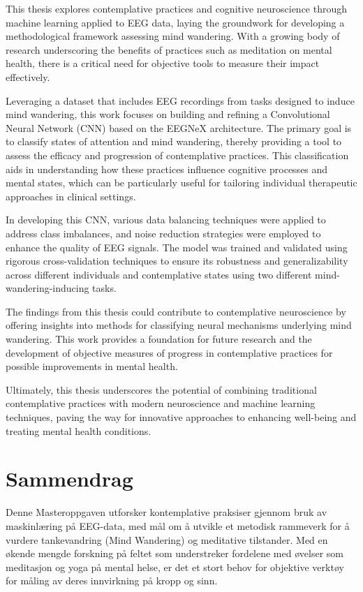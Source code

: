 
This thesis explores contemplative practices and cognitive neuroscience through machine learning applied to EEG data, laying the groundwork for developing a methodological framework assessing mind wandering. With a growing body of research underscoring the benefits of practices such as meditation on mental health, there is a critical need for objective tools to measure their impact effectively.

Leveraging a dataset that includes EEG recordings from tasks designed to induce mind wandering, this work focuses on building and refining a Convolutional Neural Network (CNN) based on the EEGNeX architecture. The primary goal is to classify states of attention and mind wandering, thereby providing a tool to assess the efficacy and progression of contemplative practices. This classification aids in understanding how these practices influence cognitive processes and mental states, which can be particularly useful for tailoring individual therapeutic approaches in clinical settings.

In developing this CNN, various data balancing techniques were applied to address class imbalances, and noise reduction strategies were employed to enhance the quality of EEG signals. The model was trained and validated using rigorous cross-validation techniques to ensure its robustness and generalizability across different individuals and contemplative states using two different mind-wandering-inducing tasks.

The findings from this thesis could contribute to contemplative neuroscience by offering insights into methods for classifying neural mechanisms underlying mind wandering. This work provides a foundation for future research and the development of objective measures of progress in contemplative practices for possible improvements in mental health.

Ultimately, this thesis underscores the potential of combining traditional contemplative practices with modern neuroscience and machine learning techniques, paving the way for innovative approaches to enhancing well-being and treating mental health conditions.

\newpage
\chapter*{Sammendrag}

Denne Masteroppgaven utforsker kontemplative praksiser gjennom bruk av maskinlæring på EEG-data, med mål om å utvikle et metodisk rammeverk for å vurdere tankevandring (Mind Wandering) og meditative tilstander. Med en økende mengde forskning på feltet som understreker fordelene med øvelser som meditasjon og yoga på mental helse, er det et stort behov for objektive verktøy for måling av deres innvirkning på kropp og sinn.

